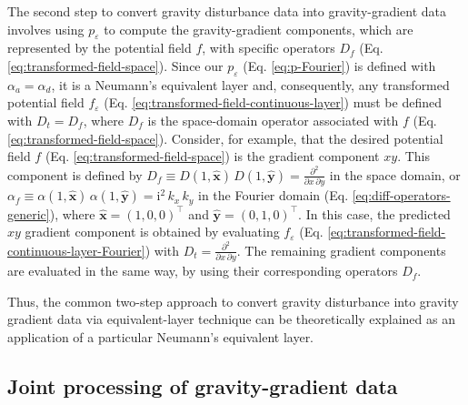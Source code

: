 The second step to convert gravity disturbance data into gravity-gradient data involves using 
$p_{\varepsilon}$ to compute the gravity-gradient components, which are represented by the 
potential field $f$, with specific operators $D_{f}$ (Eq. 
\ref{eq:transformed-field-space}). 
Since our $p_{\varepsilon}$ (Eq. \ref{eq:p-Fourier}) is defined with $\alpha_{a} = 
\alpha_{d}$, it is a Neumann's equivalent layer \cite{oliveirajr_etal2026_1} and, consequently, 
any transformed potential field $f_{\varepsilon}$ 
(Eq. \ref{eq:transformed-field-continuous-layer}) must be defined with $D_{t} = D_{f}$, 
where $D_{f}$ is the space-domain 
operator associated with $f$ (Eq. \ref{eq:transformed-field-space}).
Consider, for example, that the desired potential field $f$ (Eq. 
\ref{eq:transformed-field-space}) is the gradient 
component $xy$. This component is defined by  
$D_{f} \equiv D(1, \hat{\mathbf{x}}) \, D(1, \hat{\mathbf{y}}) = \tfrac{\partial^{2}}{\partial x \, \partial y}$ in the
space domain, or 
$\alpha_{f} \equiv \alpha(1, \hat{\mathbf{x}}) \, \alpha(1, \hat{\mathbf{y}}) = \mathrm{i}^{2} \, k_{x} \, k_{y}$
in the Fourier domain (Eq. \ref{eq:diff-operators-generic}), where 
$\hat{\mathbf{x}} = (1, 0, 0)^{\top}$ and
$\hat{\mathbf{y}} = (0, 1, 0)^{\top}$.
In this case, the predicted $xy$ gradient component is obtained by evaluating 
$f_{\varepsilon}$ (Eq. \ref{eq:transformed-field-continuous-layer-Fourier}) with 
$D_{t} = \tfrac{\partial^{2}}{\partial x \, \partial y}$.
The remaining gradient components are evaluated in the same way, by using their corresponding 
operators $D_{f}$.

Thus, the common two-step approach to convert gravity disturbance into gravity
gradient data via equivalent-layer technique 
\citep[e.g.,][]{piauilino_etal2019_seg, oliveirajr_etal2023, piauilino_etal2025b} 
can be theoretically explained as an application of a particular Neumann's equivalent layer.

\subsection{Joint processing of gravity-gradient data}

